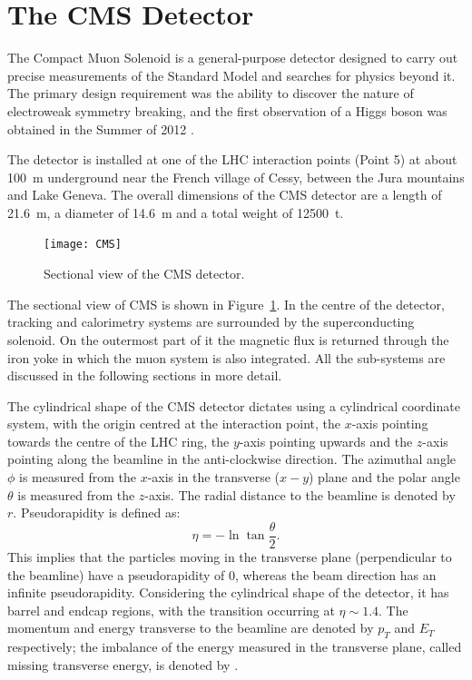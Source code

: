 
\section{The CMS Detector}
\label{s:CMS}

The Compact Muon Solenoid \autocite{CMS} is a general-purpose detector designed to carry out precise measurements of the
Standard Model and searches for physics beyond it. The primary design requirement was the ability to discover the nature
of electroweak symmetry breaking, and the first observation of a Higgs boson was obtained in the Summer of 2012
\autocite{CMS_Higgs}.

The detector is installed at one of the LHC interaction points (Point 5) at about \SI{100}{\metre} underground near the
French village of Cessy, between the Jura mountains and Lake Geneva. The overall dimensions of the CMS detector are a
length of \SI{21.6}{\metre}, a diameter of \SI{14.6}{\metre} and a total weight of \SI{12500}{\tonne}.

\begin{figure}[htbp]
  \centering
  \leavevmode
  \texttt{[image: CMS]}
  \caption{Sectional view of the CMS detector.}
  \label{fig:CMS}
\end{figure}

The sectional view of CMS is shown in Figure~\ref{fig:CMS}. In the centre of the detector, tracking and calorimetry
systems are surrounded by the superconducting solenoid. On the outermost part of it the magnetic flux is returned
through the iron yoke in which the muon system is also integrated. All the sub-systems are discussed in the following
sections in more detail.

The cylindrical shape of the CMS detector dictates using a cylindrical coordinate system, with the origin centred at the
interaction point, the $x$-axis pointing towards the centre of the LHC ring, the $y$-axis pointing upwards and the
$z$-axis pointing along the beamline in the anti-clockwise direction. The azimuthal angle $\phi$ is measured from the
$x$-axis in the transverse ($x-y$) plane and the polar angle $\theta$ is measured from the $z$-axis. The radial distance
to the beamline is denoted by $r$. Pseudorapidity is defined as:
\begin{equation}
  \eta = - \ln{\tan{\frac{\theta}{2}}}.
\end{equation}
This implies that the particles moving in the transverse plane (perpendicular to the beamline) have a pseudorapidity of
0, whereas the beam direction has an infinite pseudorapidity. Considering the cylindrical shape of the detector, it has
barrel and endcap regions, with the transition occurring at $\eta \sim 1.4$. The momentum and energy transverse to the
beamline are denoted by $p_T$ and $E_T$ respectively; the imbalance of the energy measured in the transverse plane,
called missing transverse energy, is denoted by \ETm.

